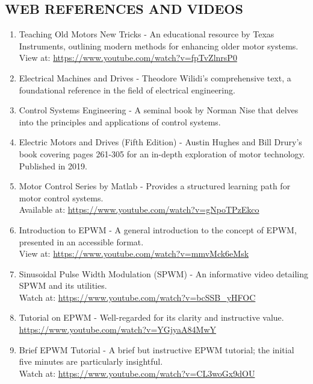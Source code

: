\subsection*{WEB REFERENCES AND VIDEOS}



\begin{enumerate}
    \item Teaching Old Motors New Tricks - An educational resource by Texas Instruments, outlining modern methods for enhancing older motor systems.\\
          View at: \url{https://www.youtube.com/watch?v=fpTvZlnrsP0}

    \item Electrical Machines and Drives - Theodore Wilidi's comprehensive text, a foundational reference in the field of electrical engineering.

    \item Control Systems Engineering - A seminal book by Norman Nise that delves into the principles and applications of control systems.

    \item Electric Motors and Drives (Fifth Edition) - Austin Hughes and Bill Drury’s book covering pages 261-305 for an in-depth exploration of motor technology. Published in 2019.

    \item Motor Control Series by Matlab - Provides a structured learning path for motor control systems.\\
          Available at: \url{https://www.youtube.com/watch?v=gNpoTPzEkco}


    \item Introduction to EPWM - A general introduction to the concept of EPWM, presented in an accessible format.\\
          View at: \url{https://www.youtube.com/watch?v=mmvMck6eMsk}

    \item Sinusoidal Pulse Width Modulation (SPWM) - An informative video detailing SPWM and its utilities.\\
          Watch at: \url{https://www.youtube.com/watch?v=bcSSB_yHFOC}

    \item Tutorial on EPWM - Well-regarded for its clarity and instructive value.\\
          \url{https://www.youtube.com/watch?v=YGjyaA84MwY}

    \item Brief EPWM Tutorial - A brief but instructive EPWM tutorial; the initial five minutes are particularly insightful.\\
          Watch at: \url{https://www.youtube.com/watch?v=CL3woGx9dOU}


\end{enumerate}
